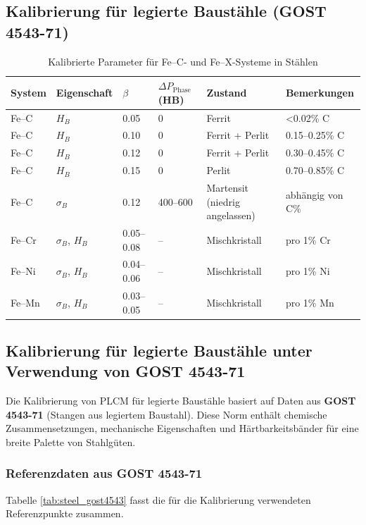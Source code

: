 \documentclass[12pt,a4paper]{article}
\begin{document}
	\subsection{Kalibrierung für legierte Baustähle (GOST 4543-71)}
	\begin{longtable}{p{2.5cm} p{1.2cm} p{1.2cm} p{1.5cm} p{2.0cm} p{2.0cm}}
		\caption{Kalibrierte Parameter für Fe–C- und Fe–X-Systeme in Stählen}\\
		\toprule
		\textbf{System} & \textbf{Eigenschaft} & $\beta$ & $\Delta P_{\text{Phase}}$ (HB) & \textbf{Zustand} & \textbf{Bemerkungen} \\
		\midrule
		Fe–C & $H_B$ & 0.05 & 0 & Ferrit & <0.02\% C \\
		Fe–C & $H_B$ & 0.10 & 0 & Ferrit + Perlit & 0.15–0.25\% C \\
		Fe–C & $H_B$ & 0.12 & 0 & Ferrit + Perlit & 0.30–0.45\% C \\
		Fe–C & $H_B$ & 0.15 & 0 & Perlit & 0.70–0.85\% C \\
		Fe–C & $\sigma_B$ & 0.12 & 400–600 & Martensit (niedrig angelassen) & abhängig von C\% \\
		Fe–Cr & $\sigma_B$, $H_B$ & 0.05–0.08 & – & Mischkristall & pro 1\% Cr \\
		Fe–Ni & $\sigma_B$, $H_B$ & 0.04–0.06 & – & Mischkristall & pro 1\% Ni \\
		Fe–Mn & $\sigma_B$, $H_B$ & 0.03–0.05 & – & Mischkristall & pro 1\% Mn \\
		\bottomrule
	\end{longtable}
	
	
	\subsection{Kalibrierung für legierte Baustähle unter Verwendung von GOST 4543-71}
	\label{subsec:steel_calibration_gost4543}
	
	Die Kalibrierung von PLCM für legierte Baustähle basiert auf Daten aus \textbf{GOST 4543-71} (Stangen aus legiertem Baustahl). Diese Norm enthält chemische Zusammensetzungen, mechanische Eigenschaften und Härtbarkeitsbänder für eine breite Palette von Stahlgüten.
	
	\subsubsection{Referenzdaten aus GOST 4543-71}
	Tabelle \ref{tab:steel_gost4543} fasst die für die Kalibrierung verwendeten Referenzpunkte zusammen.
	
\end{document}
